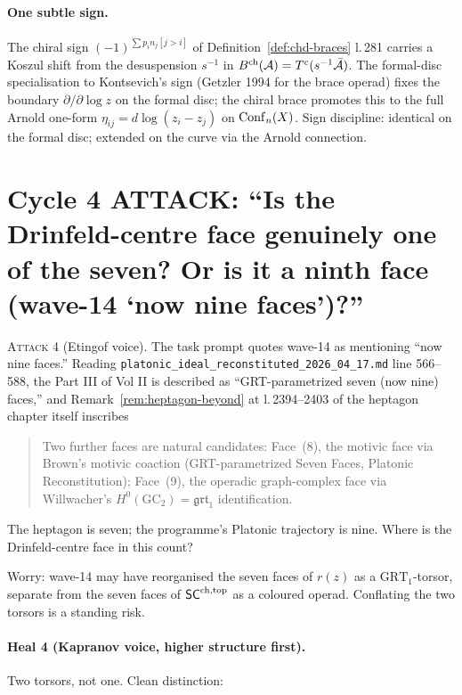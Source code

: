 \paragraph{One subtle sign.} The chiral sign $(-1)^{\sum p_i n_j[j > i]}$ of Definition~\ref*{def:chd-braces} l.\,281 carries a Koszul shift from the desuspension $s^{-1}$ in $B^{\mathrm{ch}}(\mathcal{A}) = T^c(s^{-1}\bar{\mathcal{A}})$. The formal-disc specialisation to Kontsevich's sign (Getzler 1994 for the brace operad) fixes the boundary $\partial / \partial\log z$ on the formal disc; the chiral brace promotes this to the full Arnold one-form $\eta_{ij} = d\log(z_i - z_j)$ on $\mathrm{Conf}_n(X)$. Sign discipline: identical on the formal disc; extended on the curve via the Arnold connection.

\section{Cycle 4 ATTACK: ``Is the Drinfeld-centre face genuinely one of the seven? Or is it a ninth face (wave-14 `now nine faces')?''}

\textsc{Attack 4} (Etingof voice). The task prompt quotes wave-14 as mentioning ``now nine faces.'' Reading \texttt{platonic\_ideal\_reconstituted\_2026\_04\_17.md} line 566--588, the Part III of Vol II is described as ``GRT-parametrized seven (now nine) faces,'' and Remark~\ref*{rem:heptagon-beyond} at l.\,2394--2403 of the heptagon chapter itself inscribes
\begin{quote}
Two further faces are natural candidates: Face~(8), the motivic face via Brown's motivic coaction (GRT-parametrized Seven Faces, Platonic Reconstitution); Face~(9), the operadic graph-complex face via Willwacher's $H^0(\mathrm{GC}_2) = \mathfrak{grt}_1$ identification.
\end{quote}
The heptagon is seven; the programme's Platonic trajectory is nine. Where is the Drinfeld-centre face in this count?

Worry: wave-14 may have reorganised the seven faces of $r(z)$ as a $\mathrm{GRT}_1$-torsor, separate from the seven faces of $\mathsf{SC}^{\mathrm{ch},\mathrm{top}}$ as a coloured operad. Conflating the two torsors is a standing risk.

\paragraph{Heal 4 (Kapranov voice, higher structure first).} Two torsors, not one. Clean distinction:

